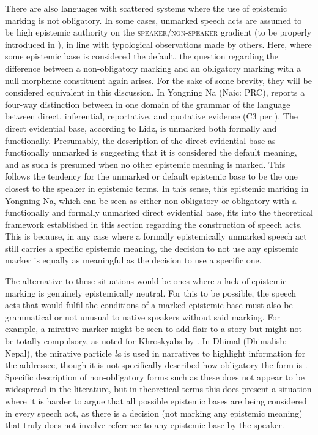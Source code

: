 There are also languages with scattered systems where the use of epistemic marking is not obligatory. In some cases, unmarked speech acts are assumed to be high epistemic authority on the \textsc{speaker/non-speaker} gradient (to be properly introduced in ), in line with typological observations made by others. Here, where some epistemic base is considered the default, the question regarding the difference between a non-obligatory marking and an obligatory marking with a null morpheme constituent again arises. For the sake of some brevity, they will be considered equivalent in this discussion. In Yongning Na (Naic: PRC),  reports a four-way distinction between in one domain of the grammar of the language between direct, inferential, reportative, and quotative evidence (C3 per ). The direct evidential base, according to Lidz, is unmarked both formally and functionally. Presumably, the description of the direct evidential base as functionally unmarked is suggesting that it is considered the default meaning, and as such is presumed when no other epistemic meaning is marked. This follows the tendency for the unmarked or default epistemic base to be the one closest to the speaker in epistemic terms. In this sense, this epistemic marking in Yongning Na, which can be seen as either non-obligatory or obligatory with a functionally and formally unmarked direct evidential base, fits into the theoretical framework established in this section regarding the construction of speech acts. This is because, in any case where a formally epistemically unmarked speech act still carries a specific epistemic meaning, the decision to not use any epistemic marker is equally as meaningful as the decision to use a specific one.

The alternative to these situations would be ones where a lack of epistemic marking is genuinely epistemically neutral. For this to be possible, the speech acts that would fulfil the conditions of a marked epistemic base must also be grammatical or not unusual to native speakers without said marking. For example, a mirative marker might be seen to add flair to a story but might not be totally compulsory, as noted for Khroskyabs by . In Dhimal (Dhimalish: Nepal), the mirative particle \textit{la} is used in narratives to highlight information for the addressee, though it is not specifically described how obligatory the form is \cite[254]{King2009}. Specific description of non-obligatory forms such as these does not appear to be widespread in the literature, but in theoretical terms this does present a situation where it is harder to argue that all possible epistemic bases are being considered in every speech act, as there is a decision (not marking any epistemic meaning) that truly does not involve reference to any epistemic base by the speaker.

